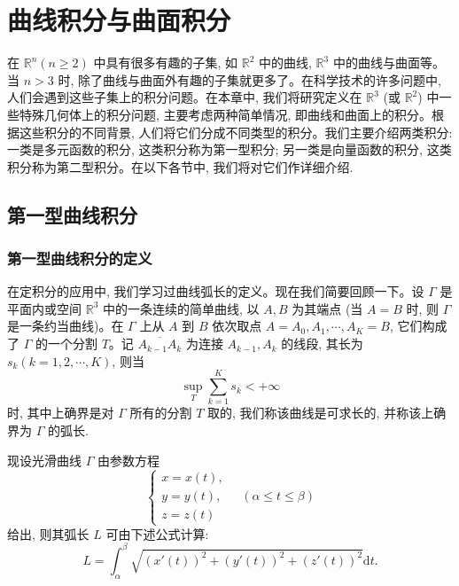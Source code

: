 \setcounter{chapter}{15} %
\chapter{曲线积分与曲面积分}
\label{chap:ma-16}

在 $\mathbb R^n(n\geqslant2)$ 中具有很多有趣的子集, 如 $\mathbb R^2$ 中的曲线, $\mathbb R^3$ 中的曲线与曲面等。当 $n>3$ 时, 除了曲线与曲面外有趣的子集就更多了。在科学技术的许多问题中, 人们会遇到这些子集上的积分问题。在本章中, 我们将研究定义在 $\mathbb R^3$ (或 $\mathbb R^2$) 中一些特殊几何体上的积分问题, 主要考虑两种简单情况, 即曲线和曲面上的积分。根据这些积分的不同背景, 人们将它们分成不同类型的积分。我们主要介绍两类积分: 一类是多元函数的积分, 这类积分称为第一型积分; 另一类是向量函数的积分, 这类积分称为第二型积分。在以下各节中, 我们将对它们作详细介绍.

\section{第一型曲线积分}
\label{sec:ma-16-1}

\subsection{第一型曲线积分的定义}
\label{subsec:ma-16-1-1}

在定积分的应用中, 我们学习过曲线弧长的定义。现在我们简要回顾一下。设 $\Gamma$ 是平面内或空间 $\mathbb R^3$ 中的一条连续的简单曲线, 以 $A,B$ 为其端点 (当 $A=B$ 时, 则 $\Gamma$ 是一条约当曲线)。在 $\Gamma$ 上从 $A$ 到 $B$ 依次取点 $A=A_0,A_1,\cdots,A_K=B$, 它们构成了 $\Gamma$ 的一个分割 $T$。记 $\overline{A_{k-1}A_k}$ 为连接 $A_{k-1},A_k$ 的线段, 其长为 $s_k(k=1,2,\cdots,K)$, 则当
\[
  \sup_T\sum_{k=1}^K s_k<+\infty
\]
时, 其中上确界是对 $\Gamma$ 所有的分割 $T$ 取的, 我们称该曲线是可求长的, 并称该上确界为 $\Gamma$ 的弧长.

现设光滑曲线 $\Gamma$ 由参数方程
\[
  \begin{cases}
    x=x(t),\\
    y=y(t),\\
    z=z(t)
  \end{cases}
  \quad(\alpha\leqslant t\leqslant \beta)
\]
给出, 则其弧长 $L$ 可由下述公式计算:
\[
  L=\int_\alpha^\beta \sqrt{(x'(t))^2+(y'(t))^2+(z'(t))^2}\mathrm dt.
\]

